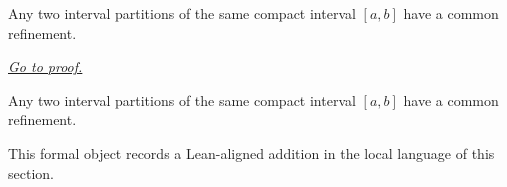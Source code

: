 \begin{theorem}
\label{thm:common-refinement-exists}
Any two interval partitions of the same compact interval $[a,b]$ have a common refinement.

\smallskip
\noindent
\hyperref[prf:common-refinement-exists]{\textit{Go to proof.}}
\end{theorem}

\begin{remark*}
Any two interval partitions of the same compact interval $[a,b]$ have a common refinement.
\end{remark*}

\begin{remark*}[Interpretation]
This formal object records a Lean-aligned addition in the local language of this section.
\end{remark*}

\begin{dependencies}
\NoLocalDependencies
\end{dependencies}
